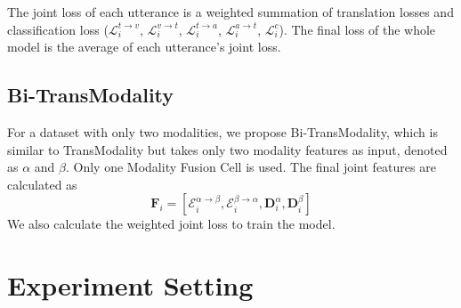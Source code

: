 \documentclass[sigconf]{acmart}
\begin{document}
	The joint loss of each utterance is a weighted summation of translation losses and classification loss ($\mathcal{L}^{t \to v}_i$, $\mathcal{L}^{v \to t}_i$, $\mathcal{L}^{t \to a}_i$, $\mathcal{L}^{a \to t}_i$, $\mathcal{L}^{c}_i$). The final loss of the whole model is the average of each utterance's joint loss.
	
	\subsection{Bi-TransModality}
	For a dataset with only two modalities, we propose Bi-TransModality, which is similar to TransModality but takes only two modality features as input, denoted as $\alpha$ and $\beta$. Only one Modality Fusion Cell is used. The final joint features are calculated as
	\begin{equation}
	\mathbf{F}_i = [\mathcal{E}^{\alpha \to \beta}_i, \mathcal{E}^{\beta \to \alpha}_i, \mathbf{D}^{\alpha}_i, \mathbf{D}^{\beta}_i]
	\end{equation}
	We also calculate the weighted joint loss to train the model.

	\section{Experiment Setting}
	
\end{document}
